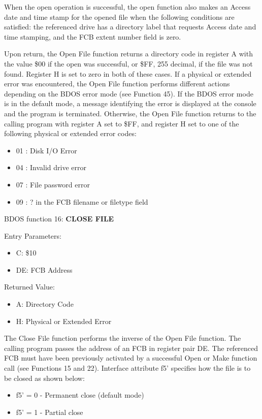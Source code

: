 When the open operation is successful, the open function also makes an
Access date and time stamp for the opened file when the following
conditions are satisfied: the referenced drive has a directory label
that requests Access date and time stamping, and the FCB extent number
field is zero.

Upon return, the Open File function returns a directory code in
register A with the value \$00 if the open was successful, or \$FF,
255 decimal, if the file was not found.  Register H is set to zero in
both of these cases. If a physical or extended error was encountered,
the Open File function performs different actions depending on the
BDOS error mode (see Function 45). If the BDOS error mode is in the
default mode, a message identifying the error is displayed at the
console and the program is terminated. Otherwise, the Open File
function returns to the calling program with register A set to \$FF,
and register H set to one of the following physical or extended error
codes:

\begin{itemize}
\item 01 : Disk I/O Error
\item 04 : Invalid drive error
\item 07 : File password error
\item 09 : ? in the FCB filename or filetype field
\end{itemize}

BDOS function 16: \textbf{CLOSE FILE}

Entry Parameters:
\begin{itemize}
\item[] C: \$10
\item[] DE: FCB Address
\end{itemize}

Returned Value:
\begin{itemize}
\item[] A: Directory Code
\item[] H: Physical or Extended Error
\end{itemize}

The Close File function performs the inverse of the Open File
function. The calling program passes the address of an FCB in register
pair DE. The referenced FCB must have been previously activated by a
successful Open or Make function call (see Functions 15 and
22). Interface attribute f5' specifies how the file is to be closed as
shown below:

\begin{itemize}
\item f5' = 0 - Permanent close (default mode)
\item f5' = 1 - Partial close
\end{itemize}

